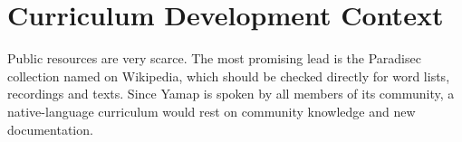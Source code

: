 \documentclass[12pt]{article}
\begin{document}
\section{Curriculum Development Context}
Public resources are very scarce. The most promising lead is the Paradisec collection named on Wikipedia, which should be checked directly for word lists, recordings and texts. Since Yamap is spoken by all members of its community, a native-language curriculum would rest on community knowledge and new documentation.
\end{document}
